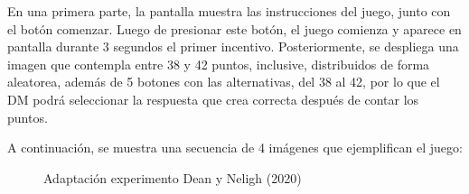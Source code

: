 \documentclass[11pt,letterpaper]{article}
\begin{document}
En una primera parte, la pantalla muestra las instrucciones del juego, junto con el botón comenzar. Luego de presionar este botón, el juego comienza y aparece en pantalla durante 3 segundos el primer incentivo. Posteriormente, se despliega una imagen que contempla entre 38 y 42 puntos, inclusive, distribuidos de forma aleatorea, además de 5 botones con las alternativas, del 38 al 42, por lo que el DM podrá seleccionar la respuesta que crea correcta después de contar los puntos. 

A continuación, se muestra una secuencia de 4 imágenes que ejemplifican el juego:


\begin{figure}[h]
    \centering
\end{figure}
\begin{figure}[h]
    \centering
    \caption{Adaptación experimento Dean y Neligh (2020)}
\end{figure}
\end{document}
